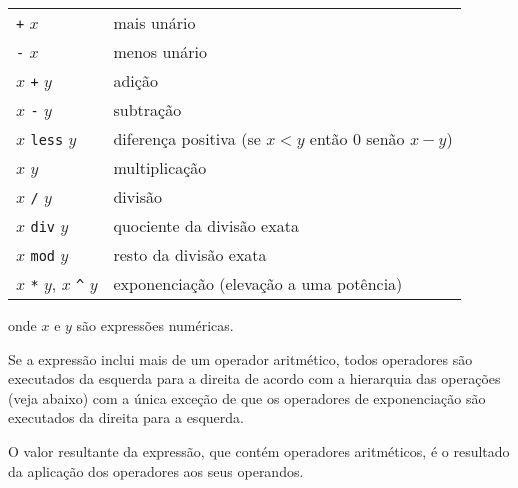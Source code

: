 \documentclass[11pt, brazil]{report}
\begin{document}
\begin{tabular}{@{}ll@{}}
{\tt +} $x$&mais unário\\
{\tt -} $x$&menos unário\\
$x$ {\tt +} $y$&adição\\
$x$ {\tt -} $y$&subtração\\
$x$ {\tt less} $y$&diferença positiva (se $x<y$ então 0 senão $x-y$)\\
$x$ {\tt *} $y$&multiplicação\\
$x$ {\tt /} $y$&divisão\\
$x$ {\tt div} $y$&quociente da divisão exata\\
$x$ {\tt mod} $y$&resto da divisão exata\\
$x$ {\tt **} $y$, $x$ {\tt\textasciicircum} $y$&exponenciação (elevação a uma potência)\\
\end{tabular}


\noindent onde $x$ e $y$ são expressões numéricas.

Se a expressão inclui mais de um operador aritmético, todos
operadores são executados da esquerda para a direita de acordo
com a hierarquia das operações (veja abaixo) com a única exceção de
que os operadores de exponenciação são executados da direita para a esquerda.

O valor resultante da expressão, que contém operadores aritméticos,
é o resultado da aplicação dos operadores aos seus operandos.

%
%
\end{document}
